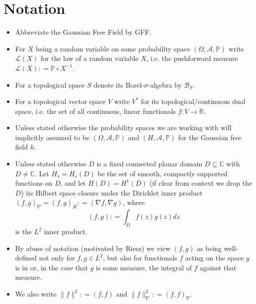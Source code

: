 \documentclass[11pt,reqno]{amsart}
\numberwithin{equation}{section}
\newcommand{\deq}{\mathrel{\mathop:}=}
\begin{document}
\tableofcontents

\section*{Notation}
\begin{itemize}
	\item Abbreviate the Gaussian Free Field by GFF.
	\item For $X$ being a random variable on some probability space $(\Omega, \mathcal A, \mathbb P)$ write $\mathcal L(X)$ for the law of a random variable $X$, i.e. the pushforward measure $\mathcal L(X)\deq \mathbb P\circ X^{-1}$.
	\item For a topological space $S$ denote its Borel-$\sigma$-algebra by $\mathcal B_S$.
	\item For a topological vector space $V$ write $V^*$ for its topological/continuous dual space, i.e. the set of all continuous, linear functionals $f:V\rightarrow\mathbb R$.
	\item Unless stated otherwise the probability spaces we are working with will implicitly assumed to be $(\Omega,\mathcal A,\mathbb P)$ and $(H,\mathcal A, \mathbb P)$ for the Gaussian free field $h$.
	\item Unless stated otherwise $D$ is a fixed connected planar domain $D\subseteq\mathbb C$ with $D\neq\mathbb C$. Let $H_s=H_s(D)$ be the set of smooth, compactly supported functions on $D$, and let $H(D)=H^1(D)$ (if clear from context we drop the $D$) its Hilbert space closure under the Dirichlet inner product $(f,g)_\nabla=(f,g)_H\deq (\nabla f,\nabla g)$, where $$(f,g)\deq\int_D f(z)g(z)dz$$ is the $L^2$ inner product.
	\item By abuse of notation (motivated by Riesz) we view $(f,g)$ as being well-defined not only for $f,g\in L^2$, but also for functionals $f$ acting on the space $g$ is in or, in the case that $g$ is some measure, the integral of $f$ against that measure.
	\item We also write $\|f\|^2\deq (f,f)$ and $\|f\|^2_\nabla\deq (f,f)_\nabla$.

\end{itemize}
\end{document}
